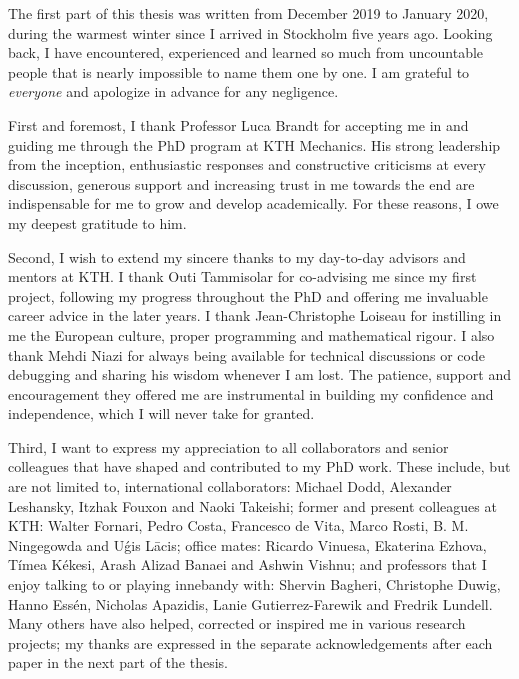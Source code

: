 \begin{acknowledgements}

  The first part of this thesis was written from December 2019 to January 2020, during the warmest winter since I arrived in Stockholm five years ago.
  Looking back, I have encountered, experienced and learned so much from uncountable people that is nearly impossible to name them one by one.
  I am grateful to \emph{everyone} and apologize in advance for any negligence.

  First and foremost, I thank Professor Luca Brandt for accepting me in and guiding me through the PhD program at KTH Mechanics.
  His strong leadership from the inception,
  enthusiastic responses and constructive criticisms at every discussion,
  generous support and increasing trust in me towards the end are indispensable for me to grow and develop academically.
  For these reasons, I owe my deepest gratitude to him.

  Second, I wish to extend my sincere thanks to my day-to-day advisors and mentors at KTH.
  I thank Outi Tammisolar for co-advising me since my first project, following my progress throughout the PhD
  and offering me invaluable career advice in the later years.
  I thank Jean-Christophe Loiseau for instilling in me the European culture, proper programming and mathematical rigour.
  I also thank Mehdi Niazi for always being available for technical discussions or code debugging and sharing his wisdom whenever I am lost.
  The patience, support and encouragement they offered me are instrumental in building my confidence and independence, which I will never take for granted.

  Third, I want to express my appreciation to all collaborators and senior colleagues that have shaped and contributed to my PhD work.
  These include, but are not limited to, international collaborators: Michael Dodd, Alexander Leshansky, Itzhak Fouxon and Naoki Takeishi;
  former and present colleagues at KTH: Walter Fornari, Pedro Costa, Francesco de Vita, Marco Rosti, B. M. Ningegowda and U\'{g}is L\={a}cis;
  office mates: Ricardo Vinuesa, Ekaterina Ezhova, Tímea Kékesi, Arash Alizad Banaei and Ashwin Vishnu;
  and professors that I enjoy talking to or playing innebandy with:
  Shervin Bagheri, Christophe Duwig, Hanno Essén, Nicholas Apazidis, Lanie Gutierrez-Farewik and Fredrik Lundell.
  Many others have also helped, corrected or inspired me in various research projects;
  my thanks are expressed in the separate acknowledgements after each paper in the next part of the thesis.
  

\end{acknowledgements}
